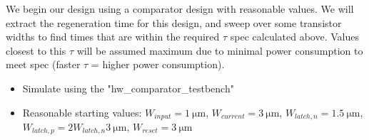 \documentclass[letterpaper, 12pt, notitlepage]{revtex4-1}
\begin{document}
We begin our design using a comparator design with reasonable values. We will extract the regeneration time for this design, and sweep over some transistor widths to find times that are within the required $\tau$ spec calculated above. Values closest to this $\tau$ will be assumed maximum due to minimal power consumption to meet spec (faster $\tau$ = higher power consumption).  
\begin{itemize}
\item Simulate using the "hw\_comparator\_testbench"
\item Reasonable starting values: $W_{input}=\SI{1}{\micro\metre}$, $W_{current}=\SI{3}{\micro\metre}$, $W_{latch,n}=\SI{1.5}{\micro\metre}$, $W_{latch,p}=2W_{latch,n}\SI{3}{\micro\metre}$, $W_{reset}=\SI{3}{\micro\metre}$
\end{itemize}



\end{document}
